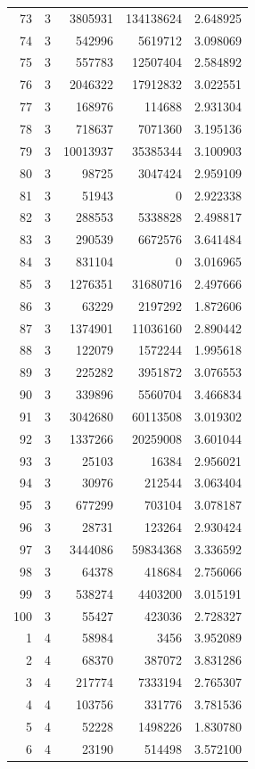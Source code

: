 \begin{longtable}{rrrrr}
73 & 3 & 3805931 & 134138624 & 2.648925\\
74 & 3 & 542996 & 5619712 & 3.098069\\
75 & 3 & 557783 & 12507404 & 2.584892\\
76 & 3 & 2046322 & 17912832 & 3.022551\\
77 & 3 & 168976 & 114688 & 2.931304\\
78 & 3 & 718637 & 7071360 & 3.195136\\
79 & 3 & 10013937 & 35385344 & 3.100903\\
80 & 3 & 98725 & 3047424 & 2.959109\\
81 & 3 & 51943 & 0 & 2.922338\\
82 & 3 & 288553 & 5338828 & 2.498817\\
83 & 3 & 290539 & 6672576 & 3.641484\\
84 & 3 & 831104 & 0 & 3.016965\\
85 & 3 & 1276351 & 31680716 & 2.497666\\
86 & 3 & 63229 & 2197292 & 1.872606\\
87 & 3 & 1374901 & 11036160 & 2.890442\\
88 & 3 & 122079 & 1572244 & 1.995618\\
89 & 3 & 225282 & 3951872 & 3.076553\\
90 & 3 & 339896 & 5560704 & 3.466834\\
91 & 3 & 3042680 & 60113508 & 3.019302\\
92 & 3 & 1337266 & 20259008 & 3.601044\\
93 & 3 & 25103 & 16384 & 2.956021\\
94 & 3 & 30976 & 212544 & 3.063404\\
95 & 3 & 677299 & 703104 & 3.078187\\
96 & 3 & 28731 & 123264 & 2.930424\\
97 & 3 & 3444086 & 59834368 & 3.336592\\
98 & 3 & 64378 & 418684 & 2.756066\\
99 & 3 & 538274 & 4403200 & 3.015191\\
100 & 3 & 55427 & 423036 & 2.728327\\
1 & 4 & 58984 & 3456 & 3.952089\\
2 & 4 & 68370 & 387072 & 3.831286\\
3 & 4 & 217774 & 7333194 & 2.765307\\
4 & 4 & 103756 & 331776 & 3.781536\\
5 & 4 & 52228 & 1498226 & 1.830780\\
6 & 4 & 23190 & 514498 & 3.572100\\

\end{longtable}
